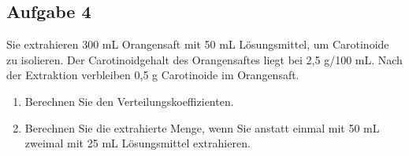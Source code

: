 \documentclass[a4paper,11pt]{article}
\newif\ifshowme
\begin{document}
\subsection*{Aufgabe 4}
Sie extrahieren 300 mL Orangensaft mit 50 mL Lösungsmittel, um Carotinoide zu isolieren.
Der Carotinoidgehalt des Orangensaftes liegt bei 2,5 g/100 mL. Nach der Extraktion
verbleiben 0,5 g Carotinoide im Orangensaft.
\begin{enumerate}[label=\alph*)]
\item Berechnen Sie den Verteilungskoeffizienten.
\ifshowme
\antwort{
\par 100 ml Orangensaft enthalten nach dem extrahieren 0,16 g Carotinoide. Das Lösungsmittel folglich (3*2,5 g - 0,5 g)/50 ml
\begin{align*}
\frac{14~\text{g / 100 ml}}{0,1\overline{6}~\text{g / 100 ml}} = 84
\end{align*}

\begin{align*}
K &= \frac{(x - y) / 50~\text{ml}}{y / 300~\text{ml}}  \\
K &= \frac{7~\text{g}/50~\text{ml}}{0,5~\text{g}/300~\text{ml}} \\
 &= 84
\end{align*}
}
\pagebreak
\else
\fi


\item Berechnen Sie die extrahierte Menge, wenn Sie anstatt einmal mit 50 mL zweimal mit 25
mL Lösungsmittel extrahieren.

\ifshowme
\antwort{

\textbf{Erste Extraktion:}
\begin{align*}
84 &= \frac{(x-y)/25~\text{ml}}{y/300~\text{ml}} \\
&= \frac{(7,5~\text{g}-y)/25~\text{ml}}{y/300~\text{ml}} \\
&= \frac{7,5~\text{g}/25~\text{ml} - y/25~\text{ml}}{y/300~\text{ml}} \\
84 \cdot \frac{y}{300~\text{ml}} &= \frac{7,5~\text{g}}{25~\text{ml}} - \frac{y}{25~\text{ml}} \\
\frac{84 \cdot y \cdot 25~\text{ml}}{300~\text{ml}} &= 7,5~\text{g} - y \\
\frac{2100y}{300} &= 7,5~\text{g} - y \\
2100y &= 2250~\text{g} - 300y \\
2400y &= 2250~\text{g} \\
y &= 0,9375 ~\text{g}
\end{align*}

\textbf{Zweite Extraktion:}
\begin{align*}
&... \\
\frac{2100y}{300} &= 0,9375 - y \\
2100y &= 281,25~\text{g} - 300y \\
2400y &= 281,25~\text{g}\\
y &= 0,117 ~\text{g}
\end{align*}

}
\else
\fi

\end{enumerate}
\end{document}
